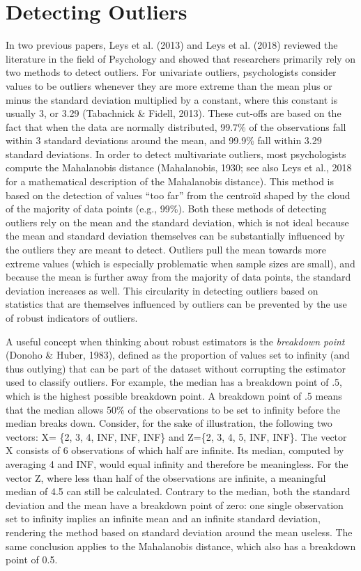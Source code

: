 \documentclass[man,floatsintext]{apa6}
\begin{document}
\hypertarget{detecting-outliers}{%
\section{Detecting Outliers}\label{detecting-outliers}}

In two previous papers, Leys et al. (2013) and Leys et al. (2018) reviewed the literature in the field of Psychology and showed that researchers primarily rely on two methods to detect outliers. For univariate outliers, psychologists consider values to be outliers whenever they are more extreme than the mean plus or minus the standard deviation multiplied by a constant, where this constant is usually 3, or 3.29 (Tabachnick \& Fidell, 2013). These cut-offs are based on the fact that when the data are normally distributed, 99.7\% of the observations fall within 3 standard deviations around the mean, and 99.9\% fall within 3.29 standard deviations. In order to detect multivariate outliers, most psychologists compute the Mahalanobis distance (Mahalanobis, 1930; see also Leys et al., 2018 for a mathematical description of the Mahalanobis distance). This method is based on the detection of values \enquote{too far} from the centroïd shaped by the cloud of the majority of data points (e.g., 99\%). Both these methods of detecting outliers rely on the mean and the standard deviation, which is not ideal because the mean and standard deviation themselves can be substantially influenced by the outliers they are meant to detect. Outliers pull the mean towards more extreme values (which is especially problematic when sample sizes are small), and because the mean is further away from the majority of data points, the standard deviation increases as well. This circularity in detecting outliers based on statistics that are themselves influenced by outliers can be prevented by the use of robust indicators of outliers.

A useful concept when thinking about robust estimators is the \emph{breakdown point} (Donoho \& Huber, 1983), defined as the proportion of values set to infinity (and thus outlying) that can be part of the dataset without corrupting the estimator used to classify outliers. For example, the median has a breakdown point of .5, which is the highest possible breakdown point. A breakdown point of .5 means that the median allows 50\% of the observations to be set to infinity before the median breaks down. Consider, for the sake of illustration, the following two vectors: X= \{2, 3, 4, INF, INF, INF\} and Z=\{2, 3, 4, 5, INF, INF\}. The vector X consists of 6 observations of which half are infinite. Its median, computed by averaging 4 and INF, would equal infinity and therefore be meaningless. For the vector Z, where less than half of the observations are infinite, a meaningful median of 4.5 can still be calculated. Contrary to the median, both the standard deviation and the mean have a breakdown point of zero: one single observation set to infinity implies an infinite mean and an infinite standard deviation, rendering the method based on standard deviation around the mean useless. The same conclusion applies to the Mahalanobis distance, which also has a breakdown point of 0.5.
\end{document}
